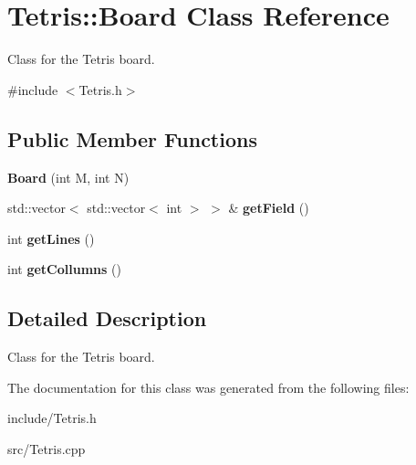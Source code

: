 \hypertarget{classTetris_1_1Board}{}\section{Tetris\+:\+:Board Class Reference}
\label{classTetris_1_1Board}


Class for the Tetris board.  




{\ttfamily \#include $<$Tetris.\+h$>$}

\subsection*{Public Member Functions}
\begin{DoxyCompactItemize}
\item 
\mbox{\label{classTetris_1_1Board_a8506030098461969d7c049785350622d}} 
{\bfseries Board} (int M, int N)
\item 
\mbox{\label{classTetris_1_1Board_ab282516ec2ee361b956ccc68a6e661df}} 
std\+::vector$<$ std\+::vector$<$ int $>$ $>$ \& {\bfseries get\+Field} ()
\item 
\mbox{\label{classTetris_1_1Board_a53a614c61a25dfb508ccb45f235bb3b5}} 
int {\bfseries get\+Lines} ()
\item 
\mbox{\label{classTetris_1_1Board_abff7a1233d19e4044b7d4ff35a347087}} 
int {\bfseries get\+Collumns} ()
\end{DoxyCompactItemize}


\subsection{Detailed Description}
Class for the Tetris board. 

The documentation for this class was generated from the following files\+:\begin{DoxyCompactItemize}
\item 
include/Tetris.\+h\item 
src/Tetris.\+cpp\end{DoxyCompactItemize}
